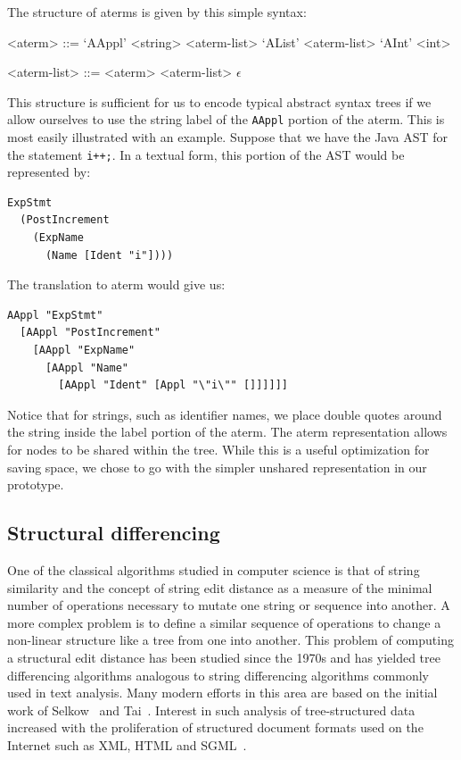 The structure of aterms is given by this simple syntax:
\setlength{\grammarindent}{8em}
\begin{grammar}
<aterm> ::= `AAppl' <string> <aterm-list>
\alt `AList' <aterm-list>
\alt `AInt' <int>

<aterm-list> ::= <aterm> <aterm-list>
\alt $\epsilon$
\end{grammar}

This structure is sufficient for us to encode typical abstract syntax trees if
we allow ourselves to use the string label of the {\tt AAppl} portion of the
aterm. This is most easily illustrated with an example.  Suppose that we have
the Java AST for the statement {\tt i++;}.  In a textual form, this portion of
the AST would be represented by:

\begin{verbatim}
ExpStmt
  (PostIncrement
    (ExpName
      (Name [Ident "i"])))
\end{verbatim}

The translation to aterm would give us:

\begin{verbatim}
AAppl "ExpStmt"
  [AAppl "PostIncrement"
    [AAppl "ExpName"
      [AAppl "Name"
        [AAppl "Ident" [Appl "\"i\"" []]]]]]
\end{verbatim}

Notice that for strings, such as identifier names, we place double quotes
around the string inside the label portion of the aterm. The aterm
representation allows for nodes to be shared within the tree. While this is a
useful optimization for saving space, we chose to go with the simpler unshared
representation in our prototype.

\subsection{Structural differencing}

One of the classical algorithms studied in computer science is that of string
similarity and the concept of string edit distance as a measure of the minimal
number of operations necessary to mutate one string or sequence into another.
A more complex problem is to define a similar sequence of operations to change
a non-linear structure like a tree from one into another.  This problem of
computing a structural edit distance has been studied since the  1970s and has
yielded tree differencing algorithms analogous to string differencing
algorithms commonly used in text analysis.  Many modern efforts in this area
are based on the initial work of Selkow~\cite{selkow77tree} and
Tai~\cite{tai79tree}.  Interest in such analysis of tree-structured data
increased with the proliferation of structured document formats used on the
Internet such as XML, HTML and SGML~\cite{chawathe96change}.

